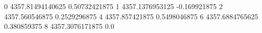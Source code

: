 0 4357.81494140625 0.50732421875
1 4357.1376953125 -0.169921875
2 4357.560546875 0.2529296875
4 4357.857421875 0.5498046875
6 4357.6884765625 0.380859375
8 4357.3076171875 0.0
